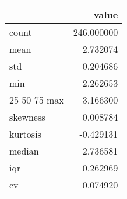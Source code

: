 \begin{tabular}{lr}
\toprule
 & value \\
\midrule
count & 246.000000 \\
mean & 2.732074 \\
std & 0.204686 \\
min & 2.262653 \\
25%
50%
75%
max & 3.166300 \\
skewness & 0.008784 \\
kurtosis & -0.429131 \\
median & 2.736581 \\
iqr & 0.262969 \\
cv & 0.074920 \\
\bottomrule
\end{tabular}
